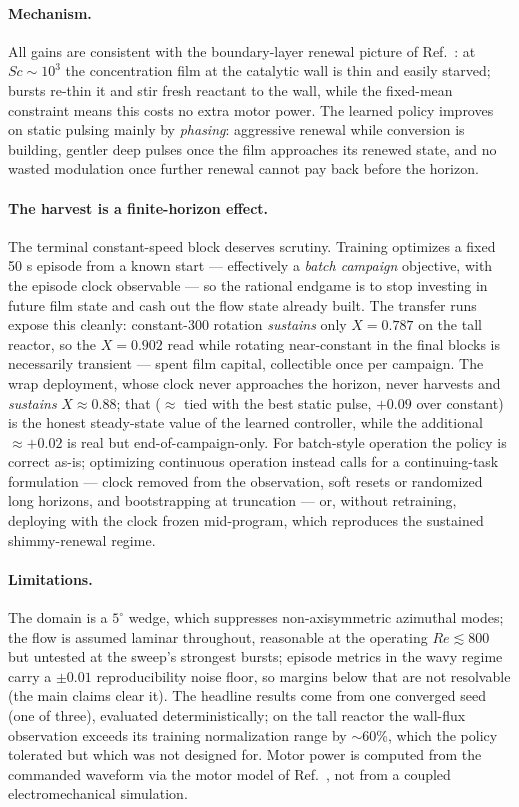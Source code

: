 \documentclass{article}
\begin{document}
\paragraph{Mechanism.} All gains are consistent with the boundary-layer
renewal picture of Ref.~\cite{lopez2024process}: at $Sc \sim 10^3$ the
concentration film at the catalytic wall is thin and easily starved; bursts
re-thin it and stir fresh reactant to the wall, while the fixed-mean
constraint means this costs no extra motor power. The learned policy improves
on static pulsing mainly by \emph{phasing}: aggressive renewal while
conversion is building, gentler deep pulses once the film approaches its
renewed state, and no wasted modulation once further renewal cannot pay back
before the horizon.

\paragraph{The harvest is a finite-horizon effect.} The terminal constant-speed
block deserves scrutiny. Training optimizes a fixed 50 s episode from a known
start --- effectively a \emph{batch campaign} objective, with the episode clock
observable --- so the rational endgame is to stop investing in future film
state and cash out the flow state already built. The transfer runs expose this
cleanly: constant-300 rotation \emph{sustains} only $X = 0.787$ on the tall
reactor, so the $X = 0.902$ read while rotating near-constant in the final
blocks is necessarily transient --- spent film capital, collectible once per
campaign. The wrap deployment, whose clock never approaches the horizon, never
harvests and \emph{sustains} $X \approx 0.88$; that ($\approx$ tied with the
best static pulse, $+0.09$ over constant) is the honest steady-state value of
the learned controller, while the additional $\approx +0.02$ is real but
end-of-campaign-only. For batch-style operation the policy is correct as-is;
optimizing continuous operation instead calls for a continuing-task
formulation --- clock removed from the observation, soft resets or randomized
long horizons, and bootstrapping at truncation --- or, without retraining,
deploying with the clock frozen mid-program, which reproduces the sustained
shimmy-renewal regime.

\paragraph{Limitations.} The domain is a $5^\circ$ wedge, which suppresses
non-axisymmetric azimuthal modes; the flow is assumed laminar throughout,
reasonable at the operating $Re \lesssim 800$ but untested at the sweep's
strongest bursts; episode metrics in the wavy regime carry a $\pm 0.01$
reproducibility noise floor, so margins below that are not resolvable (the
main claims clear it). The headline results come from one converged seed
(one of three), evaluated deterministically; on the tall reactor the
wall-flux observation exceeds its training normalization range by
$\sim$60\%, which the policy tolerated but which was not designed for. Motor
power is computed from the commanded waveform via the motor model of
Ref.~\cite{lopez2024process}, not from a coupled electromechanical simulation.
\end{document}
